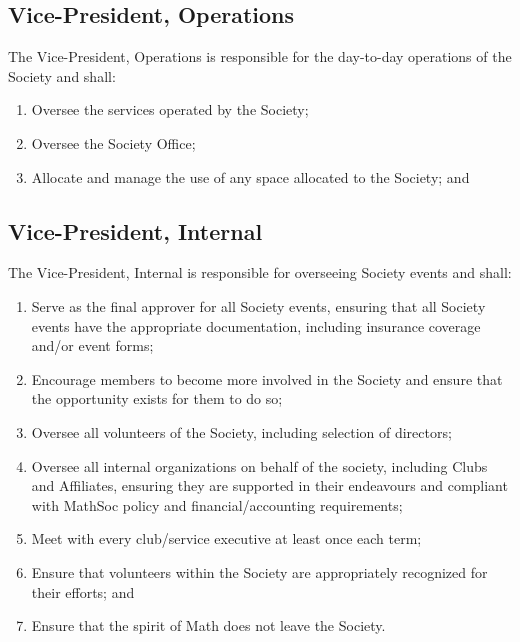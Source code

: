 \subsection{Vice-President, Operations}
The Vice-President, Operations is responsible for the day-to-day operations of
the Society and shall:
\begin{enumerate}
  \item Oversee the services operated by the Society;
  \item Oversee the Society Office;
  \item Allocate and manage the use of any space allocated to the Society; and
\end{enumerate}

\subsection{Vice-President, Internal}
The Vice-President, Internal is responsible for overseeing Society events and
shall:
\begin{enumerate}
  \item Serve as the final approver for all Society events, ensuring that all
      Society events have the appropriate documentation, including insurance
      coverage and/or event forms;
  \item Encourage members to become more involved in the Society and ensure
      that the opportunity exists for them to do so;
  \item Oversee all volunteers of the Society, including selection of
      directors;
  \item Oversee all internal organizations on behalf of the society, including
      Clubs and Affiliates, ensuring they are supported in their endeavours and
      compliant with MathSoc policy and financial/accounting requirements;
  \item Meet with every club/service executive at least once each term;
  \item Ensure that volunteers within the Society are appropriately recognized
      for their efforts; and
  \item Ensure that the spirit of Math does not leave the Society.
\end{enumerate}

